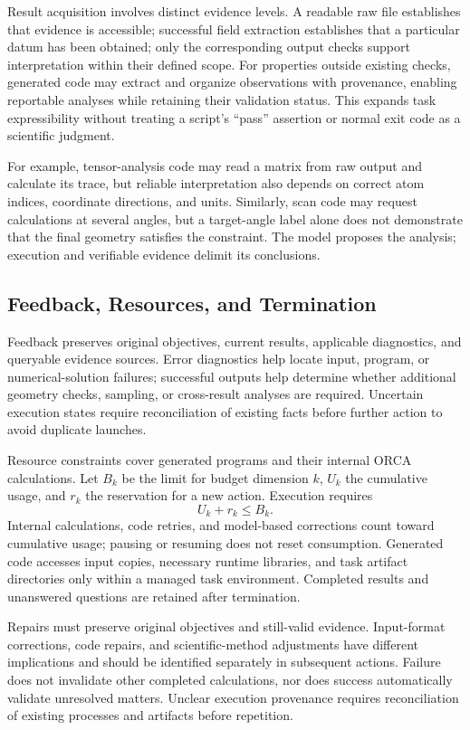 Result acquisition involves distinct evidence levels.
A readable raw file establishes that evidence is accessible; successful field extraction establishes that a particular datum has been obtained; only the corresponding output checks support interpretation within their defined scope.
For properties outside existing checks, generated code may extract and organize observations with provenance, enabling reportable analyses while retaining their validation status.
This expands task expressibility without treating a script's ``pass'' assertion or normal exit code as a scientific judgment.

For example, tensor-analysis code may read a matrix from raw output and calculate its trace, but reliable interpretation also depends on correct atom indices, coordinate directions, and units.
Similarly, scan code may request calculations at several angles, but a target-angle label alone does not demonstrate that the final geometry satisfies the constraint.
The model proposes the analysis; execution and verifiable evidence delimit its conclusions.

\subsection{Feedback, Resources, and Termination}
Feedback preserves original objectives, current results, applicable diagnostics, and queryable evidence sources.
Error diagnostics help locate input, program, or numerical-solution failures; successful outputs help determine whether additional geometry checks, sampling, or cross-result analyses are required.
Uncertain execution states require reconciliation of existing facts before further action to avoid duplicate launches.

Resource constraints cover generated programs and their internal ORCA calculations.
Let $B_k$ be the limit for budget dimension $k$, $U_k$ the cumulative usage, and $r_k$ the reservation for a new action.
Execution requires
\begin{equation}
  U_k+r_k\leq B_k.
\end{equation}
Internal calculations, code retries, and model-based corrections count toward cumulative usage; pausing or resuming does not reset consumption.
Generated code accesses input copies, necessary runtime libraries, and task artifact directories only within a managed task environment.
Completed results and unanswered questions are retained after termination.

Repairs must preserve original objectives and still-valid evidence.
Input-format corrections, code repairs, and scientific-method adjustments have different implications and should be identified separately in subsequent actions.
Failure does not invalidate other completed calculations, nor does success automatically validate unresolved matters.
Unclear execution provenance requires reconciliation of existing processes and artifacts before repetition.

